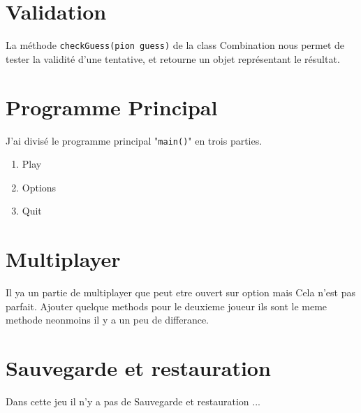 \documentclass[french,a4paper]{article} %
\begin{document}
\section{Validation}
La méthode \texttt{checkGuess(pion guess)} de la class Combination nous permet de tester la
validité d’une tentative, et retourne un objet représentant le résultat.

\section{Programme Principal}
J'ai divisé le programme principal "\texttt{main()}" en trois parties.
\begin{enumerate}
	\item Play
	\item Options
	\item Quit
\end{enumerate} 

\section{Multiplayer}
Il ya un partie de multiplayer que peut etre ouvert sur option mais Cela n'est pas parfait. Ajouter quelque methods pour le deuxieme joueur ils sont le meme methode neonmoins il y a un peu de differance.

\section{Sauvegarde et restauration}
Dans cette jeu il n'y a pas de Sauvegarde et restauration ...
\end{document}

